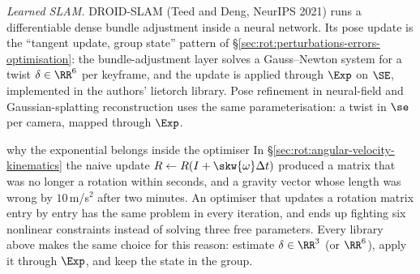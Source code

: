 \emph{Learned SLAM.} DROID-SLAM (Teed and Deng, NeurIPS 2021) runs a differentiable dense bundle adjustment inside a neural network. Its pose update is the ``tangent update, group state'' pattern of \S\ref{sec:rot:perturbations-errors-optimisation}: the bundle-adjustment layer solves a Gauss--Newton system for a twist $\delta\in\RR^6$ per keyframe, and the update is applied through $\Exp$ on $\SE$, implemented in the authors' lietorch library. Pose refinement in neural-field and Gaussian-splatting reconstruction uses the same parameterisation: a twist in $\se$ per camera, mapped through $\Exp$.

\begin{example}{why the exponential belongs inside the optimiser}
In \S\ref{sec:rot:angular-velocity-kinematics} the naive update $R\leftarrow R(I+\skw{\omega}\Delta t)$ produced a matrix that was no longer a rotation within seconds, and a gravity vector whose length was wrong by $10$\,m/s$^2$ after two minutes. An optimiser that updates a rotation matrix entry by entry has the same problem in every iteration, and ends up fighting six nonlinear constraints instead of solving three free parameters. Every library above makes the same choice for this reason: estimate $\delta\in\RR^3$ (or $\RR^6$), apply it through $\Exp$, and keep the state in the group.
\end{example}
